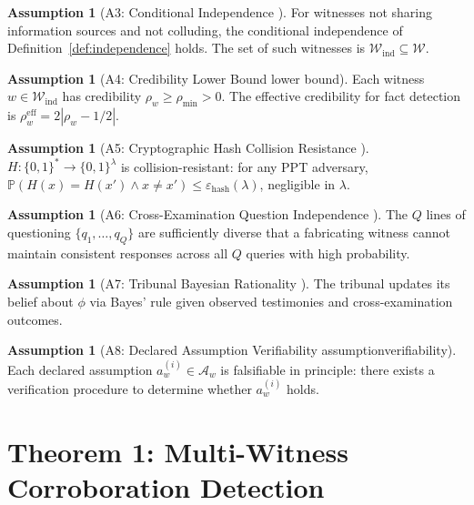 \documentclass[11pt,a4paper]{article}
\theoremstyle{definition}
\newtheorem{assumption}[theorem]{Assumption}
\newcommand{\Pbb}{\mathbb{P}}
\newcommand{\abs}[1]{\left|#1\right|}
\newcommand{\witnessSet}{\mathcal{W}}           %
\newcommand{\fact}{\phi}                        %
\newcommand{\hashFunc}{H}                       %
\begin{document}
\begin{assumption}[A3: Conditional Independence ]
\label{ass:A3}
For witnesses not sharing information sources and not colluding, the conditional independence of Definition~\ref{def:independence} holds. The set of such witnesses is $\witnessSet_{\mathrm{ind}} \subseteq \witnessSet$.
\end{assumption}

\begin{assumption}[A4: Credibility Lower Bound lower bound]
\label{ass:A4}
Each witness $w \in \witnessSet_{\mathrm{ind}}$ has credibility $\rho_w \geq \rho_{\min} > 0$. The effective credibility for fact detection is $\rho_w^{\mathrm{eff}} = 2\abs{\rho_w - 1/2}$.
\end{assumption}

\begin{assumption}[A5: Cryptographic Hash Collision Resistance ]
\label{ass:A5}
$\hashFunc: \{0, 1\}^* \to \{0, 1\}^\lambda$ is collision-resistant: for any PPT adversary, $\Pbb(\hashFunc(x) = \hashFunc(x') \land x \neq x') \leq \varepsilon_{\mathrm{hash}}(\lambda)$, negligible in $\lambda$.
\end{assumption}

\begin{assumption}[A6: Cross-Examination Question Independence ]
\label{ass:A6}
The $Q$ lines of questioning $\{q_1, \ldots, q_Q\}$ are sufficiently diverse that a fabricating witness cannot maintain consistent responses across all $Q$ queries with high probability.
\end{assumption}

\begin{assumption}[A7: Tribunal Bayesian Rationality ]
\label{ass:A7}
The tribunal updates its belief about $\fact$ via Bayes' rule given observed testimonies and cross-examination outcomes.
\end{assumption}

\begin{assumption}[A8: Declared Assumption Verifiability assumptionverifiability]
\label{ass:A8}
Each declared assumption $a_w^{(i)} \in \mathcal{A}_w$ is falsifiable in principle: there exists a verification procedure to determine whether $a_w^{(i)}$ holds.
\end{assumption}

\section{Theorem 1: Multi-Witness Corroboration Detection }
\label{sec:corroboration}
\end{document}
